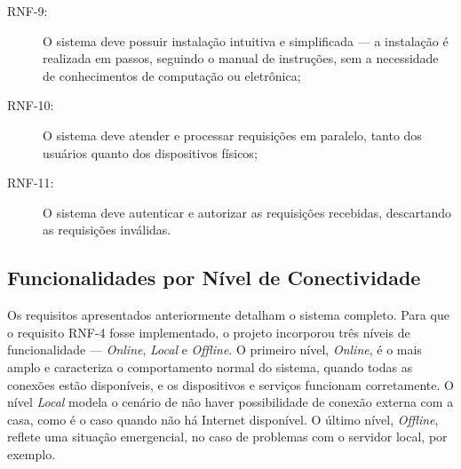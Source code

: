 \begin{description}
\item[RNF-9:]O sistema deve possuir instalação intuitiva e simplificada --- a instalação é realizada em passos, seguindo o manual de instruções, sem a necessidade de conhecimentos de computação ou eletrônica;
\item[RNF-10:]O sistema deve atender e processar requisições em paralelo, tanto dos usuários quanto dos dispositivos físicos;
\item[RNF-11:]O sistema deve autenticar e autorizar as requisições recebidas, descartando as requisições inválidas.
\end{description}

\subsection{Funcionalidades por Nível de Conectividade}

Os requisitos apresentados anteriormente detalham o sistema completo. Para que o requisito RNF-4 fosse implementado, o projeto incorporou três níveis de funcionalidade --- \emph{Online}, \emph{Local} e \emph{Offline}. O primeiro nível, \emph{Online}, é o mais amplo e caracteriza o comportamento normal do sistema, quando todas as conexões estão disponíveis, e os dispositivos e serviços funcionam corretamente. O nível \emph{Local} modela o cenário de não haver possibilidade de conexão externa com a casa, como é o caso quando não há Internet disponível. O último nível, \emph{Offline}, reflete uma situação emergencial, no caso de problemas com o servidor local, por exemplo.
